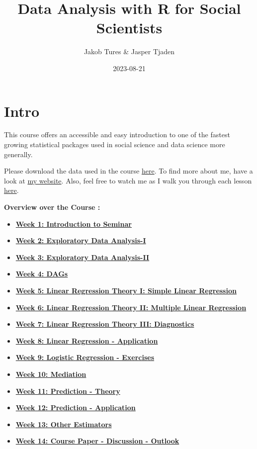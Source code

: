 \documentclass[
]{book}
\title{Data Analysis with R for Social Scientists}
\author{Jakob Tures \& Jasper Tjaden}
\date{2023-08-21}
\providecommand{\tightlist}{%
  \setlength{\itemsep}{0pt}\setlength{\parskip}{0pt}}
\begin{document}
\maketitle

{
\setcounter{tocdepth}{1}
\tableofcontents
}
\hypertarget{intro}{%
\chapter*{Intro}\label{intro}}

This course offers an accessible and easy introduction to one of the fastest growing statistical packages used in social science and data science more generally.

Please download the data used in the course \href{https://www.worldvaluessurvey.org/WVSDocumentationWV7.jsp}{here}. To find more about me, have a look at \href{https://jaspertjaden.com}{my website}. Also, feel free to watch me as I walk you through each lesson \href{https://www.youtube.com/playlist?list=PLr43hk2e3hFMg4tZdJsN0qzG5YkQB3A1c}{here}.

\textbf{Overview over the Course :}

\begin{itemize}
\tightlist
\item
  \textbf{\protect\hyperlink{intro-sem}{Week 1: Introduction to Seminar}}
\item
  \textbf{\protect\hyperlink{eda-1}{Week 2: Exploratory Data Analysis-I}}
\item
  \textbf{\protect\hyperlink{eda-2}{Week 3: Exploratory Data Analysis-II}}
\item
  \textbf{\protect\hyperlink{dags-1}{Week 4: DAGs}}
\item
  \textbf{\protect\hyperlink{lin-t-1}{Week 5: Linear Regression Theory I: Simple Linear Regression}}
\item
  \textbf{\protect\hyperlink{lin-t-2}{Week 6: Linear Regression Theory II: Multiple Linear Regression}}
\item
  \textbf{\protect\hyperlink{lin-t-3}{Week 7: Linear Regression Theory III: Diagnostics}}
\item
  \textbf{\protect\hyperlink{lin-a}{Week 8: Linear Regression - Application}}
\item
  \textbf{\protect\hyperlink{lin-e}{Week 9: Logistic Regression - Exercises}}
\item
  \textbf{\protect\hyperlink{med}{Week 10: Mediation}}
\item
  \textbf{\protect\hyperlink{pm-t}{Week 11: Prediction - Theory}}
\item
  \textbf{\protect\hyperlink{pm-a}{Week 12: Prediction - Application}}
\item
  \textbf{\protect\hyperlink{other-est}{Week 13: Other Estimators}}
\item
  \textbf{\protect\hyperlink{out-look}{Week 14: Course Paper - Discussion - Outlook}}
\end{itemize}
\end{document}
